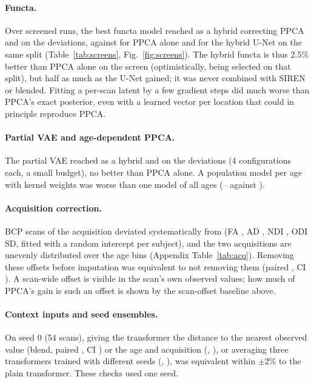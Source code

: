 \documentclass[11pt]{article}
\begin{document}
\paragraph{Functa.} Over \nFunctaConfigs{} screened runs, the best functa model reached \sFunctaHyb{} as a hybrid
correcting PPCA and \sFunctaDev{} on the deviations, against \sPpca{} for PPCA alone and \sUnet{} for the hybrid U-Net on
the same split (Table~\ref{tab:screens}, Fig.~\ref{fig:screens}). The hybrid functa is thus 2.5\% better than PPCA alone
on the screen (optimistically, being selected on that split), but half as much as the U-Net gained; it was never
combined with SIREN or blended. Fitting a per-scan latent by a few gradient steps did much worse than PPCA's exact
posterior, even with a learned vector per location that could in principle reproduce PPCA.

\paragraph{Partial VAE and age-dependent PPCA.} The partial VAE reached \sVaeHyb{} as a hybrid and \sVaeDev{} on the
deviations (4 configurations each, a small budget), no better than PPCA alone. A population model per age with kernel
weights was worse than one model of all ages (\sAgePpca--\sAgePpcaMax{} against \sPpca{}).

\paragraph{Acquisition correction.} BCP scans of the \texttt{\bcpAcqBName} acquisition deviated systematically from
\texttt{\bcpAcqAName} (FA \acqOffFA, AD \acqOffAD, NDI \acqOffNDI, ODI \acqOffODI{} SD, fitted with a random intercept per
subject), and the two acquisitions are unevenly distributed over the age bins (Appendix Table~\ref{tab:acq}). Removing
these offsets before imputation was equivalent to not removing them (paired \cPRatio, CI \cPBci). A scan-wide offset is
visible in the scan's own observed values; how much of PPCA's gain is such an offset is shown by the scan-offset baseline
above.

\paragraph{Context inputs and seed ensembles.} On seed 0 (54 scans), giving the transformer the distance to the
nearest observed value (blend, paired \xDistRatioBlend, CI \xDistCiBlend) or the age and acquisition
(\xCtxRatioBlend, \xCtxCiBlend), or averaging three transformers trained with different seeds (\xMembersRatioBlend,
\xMembersCiBlend), was equivalent within $\pm2\%$ to the plain transformer. These checks used one seed.
\end{document}
